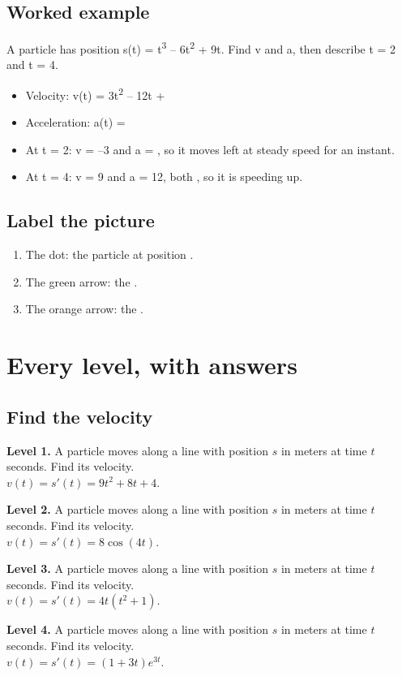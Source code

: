 \documentclass[11pt]{article}
\begin{document}
\subsection*{Worked example}
A particle has position s(t) = t\textsuperscript{3} -- 6t\textsuperscript{2} + 9t. Find v and a, then describe t = 2 and t = 4.\\
\begin{itemize}
\item Velocity: v(t) = 3t\textsuperscript{2} -- 12t + 
\item Acceleration: a(t) = 
\item At t = 2: v = --3 and a = , so it moves left at steady speed for an instant.
\item At t = 4: v = 9 and a = 12, both , so it is speeding up.
\end{itemize}
\subsection*{Label the picture}
\begin{enumerate}
\item The dot: the particle at position .
\item The green arrow: the .
\item The orange arrow: the .
\end{enumerate}
\section*{Every level, with answers}
\subsection*{Find the velocity}
\noindent\textbf{Level 1.} A particle moves along a line with position $s$ in meters at time $t$ seconds. Find its velocity.\\  \quad $v(t)=s'(t)=9t^{2}+8t+4$.\par\medskip
\noindent\textbf{Level 2.} A particle moves along a line with position $s$ in meters at time $t$ seconds. Find its velocity.\\  \quad $v(t)=s'(t)=8\cos(4t)$.\par\medskip
\noindent\textbf{Level 3.} A particle moves along a line with position $s$ in meters at time $t$ seconds. Find its velocity.\\  \quad $v(t)=s'(t)=4t(t^{2}+1)$.\par\medskip
\noindent\textbf{Level 4.} A particle moves along a line with position $s$ in meters at time $t$ seconds. Find its velocity.\\  \quad $v(t)=s'(t)=(1+3t)e^{3t}$.\par\medskip
\end{document}
